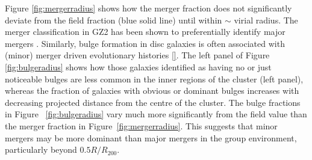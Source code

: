 \documentclass[useAMS,usenatbib]{mn2e}
\begin{document}
Figure \ref{fig:mergerradius} shows how the merger fraction does not significantly deviate from the field fraction (blue solid line) until within $\sim$ virial radius. The merger classification in GZ2 has been shown to preferentially identify major mergers \citep{darg10a}. Similarly, bulge formation in disc galaxies is often associated with (minor) merger driven evolutionary histories \ref{}. The left panel of Figure \ref{fig:bulgeradius} shows how those galaxies identified as having no or just noticeable bulges are less common in the inner regions of the cluster (left panel), whereas the fraction of galaxies with obvious or dominant bulges increases with decreasing projected distance from the centre of the cluster. The bulge fractions in Figure ~\ref{fig:bulgeradius} vary much more significantly from the field value than the merger fraction in Figure~\ref{fig:mergerradius}. This suggests that minor mergers may be more dominant than major mergers in the group environment, particularly beyond $0.5 R/R_{200}$. 
\end{document}
